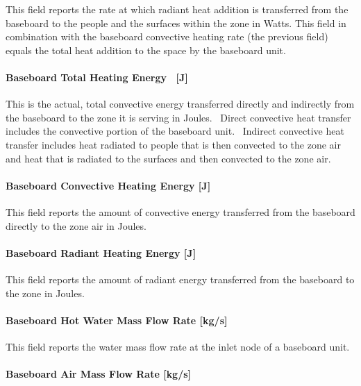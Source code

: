 This field reports the rate at which radiant heat addition is transferred from the baseboard to the people and the surfaces within the zone in Watts.  This field in combination with the baseboard convective heating rate (the previous field) equals the total heat addition to the space by the baseboard unit.

\paragraph{Baseboard Total Heating Energy ~{[}J{]}}\label{baseboard-total-heating-energy-j-000}

This is the actual, total convective energy transferred directly and indirectly from the baseboard to the zone it is serving in Joules.~ Direct convective heat transfer includes the convective portion of the baseboard unit.~ Indirect convective heat transfer includes heat radiated to people that is then convected to the zone air and heat that is radiated to the surfaces and then convected to the zone air.

\paragraph{Baseboard Convective Heating Energy {[}J{]}}\label{baseboard-convective-heating-energy-j-000}

This field reports the amount of convective energy transferred from the baseboard directly to the zone air in Joules.

\paragraph{Baseboard Radiant Heating Energy {[}J{]}}\label{baseboard-radiant-heating-energy-j-000}

This field reports the amount of radiant energy transferred from the baseboard to the zone in Joules.

\paragraph{Baseboard Hot Water Mass Flow Rate {[}kg/s{]}}\label{baseboard-hot-water-mass-flow-rate-kgs}

This field reports the water mass flow rate at the inlet node of a baseboard unit.

\paragraph{Baseboard Air Mass Flow Rate {[}kg/s{]}}\label{baseboard-air-mass-flow-rate-kgs}

